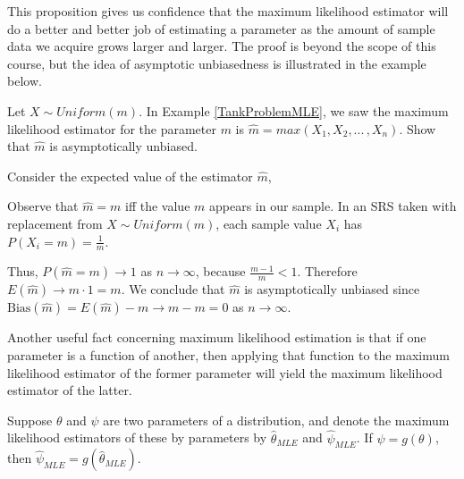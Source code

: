 This proposition gives us confidence that the maximum likelihood estimator will do a better and better job of estimating a parameter as the amount of sample data we acquire grows larger and larger. The proof is beyond the scope of this course, but the idea of asymptotic unbiasedness is illustrated in the example below.
\begin{examp} Let $X \sim Uniform(m)$. In Example \ref{TankProblemMLE}, we saw the maximum likelihood estimator for the parameter $m$ is $\widehat{m} = max(X_1,X_2,...\,,X_n)$. Show that $\widehat{m}$ is asymptotically unbiased.
\par
\noindent Consider the expected value of the estimator $\widehat{m}$,
\par
\noindent Observe that $\widehat{m} =  m$ iff the value $m$ appears in our sample. In an SRS taken with replacement from $X \sim Uniform(m)$, each sample value $X_i$ has $P(X_i = m) = \frac{1}{m}$.
\par
\noindent Thus, $P(\widehat{m} = m) \to 1$ as $n \to \infty$, because $\frac{m-1}{m} < 1$. Therefore $E(\widehat{m}) \to m \cdot 1 = m$. We conclude that $\widehat{m}$ is asymptotically unbiased since $\text{Bias}(\widehat{m}) = E(\widehat{m}) - m  \to m - m = 0$ as $n \to \infty$.
\end{examp}
\par
Another useful fact concerning maximum likelihood estimation is that if one parameter is a function of another, then applying that function to the maximum likelihood estimator of the former parameter will yield the maximum likelihood estimator of the latter.

\begin{prop}\label{MLETransferability} Suppose $\theta$ and $\psi$ are two parameters of a distribution, and denote the maximum likelihood estimators of these by parameters by $\widehat{\theta}_{MLE}$ and $\widehat{\psi}_{MLE}$. If $\psi = g (\theta)$, then $\widehat{\psi}_{MLE} = g(\widehat{\theta}_{MLE})$.
\end{prop}


